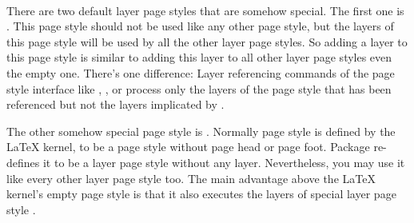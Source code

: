 \begin{Declaration}
  \\
\end{Declaration}
%
%
There are two default layer page styles that are somehow special. The first
one is . This page style should not be used like any
other page style, but the layers of this page style will be used by all the
other layer page styles. So adding a layer to this page style is similar to
adding this layer to all other layer page styles even the empty one. There's
one difference: Layer referencing commands of the page style interface like
, , or
 process only the layers of the page
style that has been referenced but not the layers implicated by
.

The other somehow special page style is . Normally page style
 is defined by the \LaTeX{} kernel, to be a page style
without page head or page foot. Package  re-defines it to be
a layer page style without any layer. Nevertheless, you may use it like every
other layer page style too. The main advantage above the \LaTeX{} kernel's
empty page style is that it also executes the layers of special layer page
style .%
%
%

